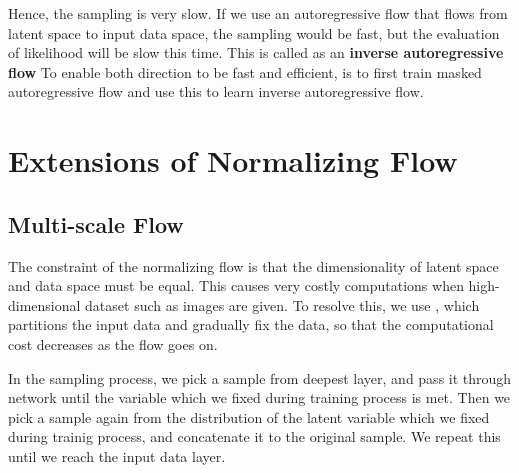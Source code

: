 \documentclass{article}
\begin{document}
            Hence, the sampling is very slow. If we use an autoregressive flow that flows from latent space to input data space,
            the sampling would be fast, but the evaluation of likelihood will be slow this time. This is called as an \textbf{inverse autoregressive flow}
            To enable both direction to be fast and efficient, is to first train masked autoregressive flow and use this to learn inverse autoregressive flow. 


\section{Extensions of Normalizing Flow}
    \subsection{Multi-scale Flow}
        The constraint of the normalizing flow is that the dimensionality of latent space and data space must be equal.
        This causes very costly computations when high-dimensional dataset such as images are given. To resolve this, we use
        , which partitions the input data and gradually fix the data, so that the computational cost decreases as the flow goes on.

        In the sampling process, we pick a sample from deepest layer, and pass it through network until the variable which we fixed during training process is met.
        Then we pick a sample again from the distribution of the latent variable which we fixed during trainig process, and concatenate it to the original sample.
        We repeat this until we reach the input data layer.
\end{document}
